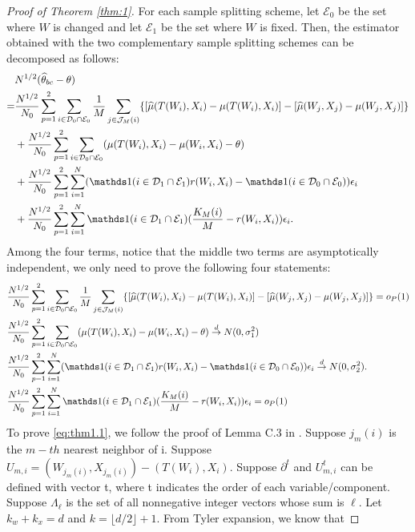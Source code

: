 \documentclass[11pt]{article}
\numberwithin{equation}{section}
\theoremstyle{definition}
\begin{document}
\begin{proof}[Proof of Theorem \ref{thm:1}]
    For each sample splitting scheme, let $\mathcal{E}_0$ be the set where $W$ is changed and let $\mathcal{E}_1$ be the set where $W$ is fixed. Then, the estimator obtained with the two complementary sample splitting schemes can be decomposed as follows:
    \begin{align*}
        &N^{1/2}(\widehat{\theta}_{bc}-\theta)\\
        =&\frac{N^{1/2}}{N_0}\sum_{p=1}^2\sum_{i\in \mathcal{D}_0\cap\mathcal{E}_0}\frac{1}{M}\sum_{j\in\mathcal{J}_M(i)}\{[\widehat{\mu}(T(W_i),X_i)-\mu(T(W_i),X_i)]-[\widehat{\mu}(W_j,X_j)-\mu(W_j,X_j)]\}\\
        &+\frac{N^{1/2}}{N_0}\sum_{p=1}^2\sum_{i\in \mathcal{D}_0\cap\mathcal{E}_0}(\mu(T(W_i),X_i)-\mu(W_i,X_i)-\theta)\\
        &+\frac{N^{1/2}}{N_0}\sum_{p=1}^2\sum_{i=1}^N(\ind(i\in\mathcal{D}_1\cap\mathcal{E}_1)r(W_i,X_i)-\ind(i\in\mathcal{D}_0\cap\mathcal{E}_0))\epsilon_i\\
        &+\frac{N^{1/2}}{N_0}\sum_{p=1}^2\sum_{i=1}^N\ind(i\in\mathcal{D}_1\cap\mathcal{E}_1)(\frac{K_M(i)}{M}-r(W_i,X_i))\epsilon_i.
    \end{align*}
    Among the four terms, notice that the middle two terms are asymptotically independent, we only need to prove the following four statements:
        \begin{align}
            &\frac{N^{1/2}}{N_0}\sum_{p=1}^2\sum_{i\in \mathcal{D}_0\cap\mathcal{E}_0}\frac{1}{M}\sum_{j\in\mathcal{J}_M(i)}\{[\widehat{\mu}(T(W_i),X_i)-\mu(T(W_i),X_i)]-[\widehat{\mu}(W_j,X_j)-\mu(W_j,X_j)]\}=o_P(1)\label{eq:thm1.1}\\
            &\frac{N^{1/2}}{N_0}\sum_{p=1}^2\sum_{i\in \mathcal{D}_0\cap\mathcal{E}_0}(\mu(T(W_i),X_i)-\mu(W_i,X_i)-\theta)\overset{d}{\to}N(0,\sigma_1^2)\label{eq:thm1.2}\\
            &\frac{N^{1/2}}{N_0}\sum_{p=1}^2\sum_{i=1}^N(\ind(i\in\mathcal{D}_1\cap\mathcal{E}_1)r(W_i,X_i)-\ind(i\in\mathcal{D}_0\cap\mathcal{E}_0))\epsilon_i\overset{d}{\to}N(0,\sigma_2^2).\label{eq:thm1.3}\\ 
            &\frac{N^{1/2}}{N_0}\sum_{p=1}^2\sum_{i=1}^N\ind(i\in\mathcal{D}_1\cap\mathcal{E}_1)(\frac{K_M(i)}{M}-r(W_i,X_i))\epsilon_i=o_P(1)\label{eq:thm1.4}  
        \end{align}
    To prove \eqref{eq:thm1.1}, we follow the proof of Lemma C.3 in \cite{lin2023estimation}. Suppose $j_m(i)$ is the $m-th$ nearest neighbor of i. Suppose $U_{m,i}=(W_{j_m(i)},X_{j_m(i)})-(T(W_i),X_i)$. Suppose $\partial^t$ and $U_{m,i}^t$ can be defined with vector t, where t indicates the order of each variable/component. Suppose $\Lambda_{\ell}$ is the set of all nonnegative integer vectors whose sum is $\ell$. Let $k_w+k_x=d$ and $k=\lfloor d/2\rfloor+1$. From Tyler expansion, we know that 

\end{proof}
\end{document}
